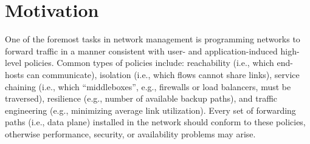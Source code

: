 \section{Motivation} \label{sec:motivation}

One of the foremost tasks in network management is programming 
networks to forward traffic in a manner consistent with user- and
application-induced high-level policies. Common types of policies
include: reachability (i.e., which end-hosts can communicate),
isolation (i.e., which flows cannot share links), service chaining
(i.e., which ``middleboxes'', e.g., firewalls or load
balancers, must be traversed), resilience (e.g., number of available backup paths), and traffic engineering (e.g., minimizing average
link utilization). Every set of forwarding paths (i.e., data plane)
installed in the network
should conform to these 
policies, otherwise performance, security, or availability problems may arise.

